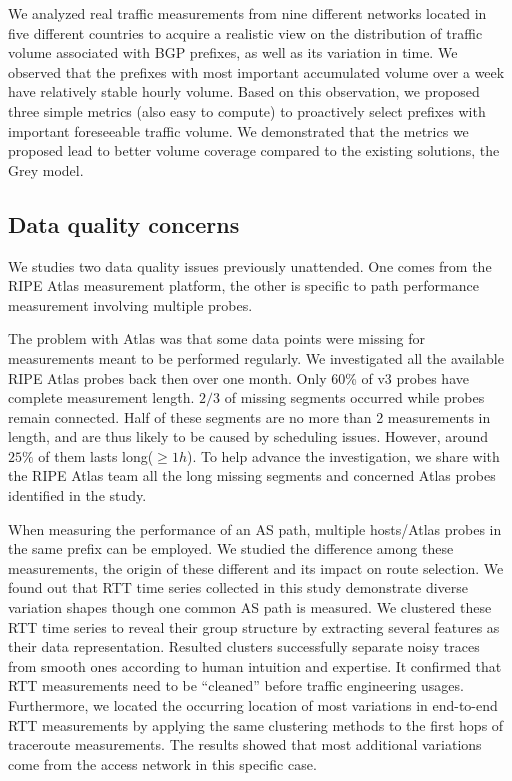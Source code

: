 We analyzed real traffic measurements from nine different networks located in five different countries to acquire a realistic view on the distribution of traffic volume associated with BGP prefixes, as well as its variation in time.   
We observed that the prefixes with most important accumulated volume over a week have relatively stable hourly volume. 
Based on this observation, we proposed three simple 
metrics (also easy to compute) to proactively select prefixes with important foreseeable traffic volume.
We demonstrated that the metrics we proposed lead to better volume coverage compared to the existing solutions, the Grey model.

\subsection{Data quality concerns}
We studies two data quality issues previously unattended. One comes from the RIPE Atlas measurement platform, the other is specific to path performance measurement involving multiple probes.

The problem with Atlas was that some data points were missing for measurements meant to be performed regularly.
We investigated all the available RIPE Atlas probes back then over one month. Only 60\% of v3 probes have complete measurement length. 
$2/3$ of missing segments occurred while probes remain connected. 
Half of these segments are no more than 2 measurements in length, and are thus likely to be caused by scheduling issues. However, around $25\%$ of them lasts long($\geq 1h$). 
To help advance the investigation, we share with the RIPE Atlas team all the long missing segments and concerned Atlas probes identified in the study.

When measuring the performance of an AS path, multiple hosts/Atlas probes in the same  prefix can be employed. We studied the difference among these measurements, the origin of these different and its impact on route selection.
We found out that RTT time series collected in this study demonstrate diverse variation shapes though one common AS path is measured.
We clustered these RTT time series to reveal their group structure by extracting several features as their data representation. 
Resulted clusters successfully separate noisy traces from smooth ones according to human intuition and expertise.
It confirmed that RTT measurements need to be ``cleaned'' before traffic engineering usages.
Furthermore, we located the occurring location of most variations in end-to-end RTT measurements by applying the same clustering methods to the first hops of traceroute measurements.
The results showed that most additional variations come from the access network in this specific case.

